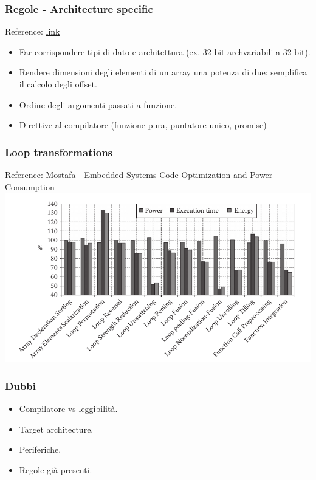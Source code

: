 \documentclass{beamer}
\begin{document}
\begin{frame}
\frametitle{Regole - Architecture specific}
Reference: \href{https://www.embedded.com/energy-efficient-c-code-for-arm-devices/}{link}
\begin{itemize}
\item Far corrispondere tipi di dato e architettura (ex. 32 bit arch\textrightarrow variabili a 32 bit).
\item Rendere dimensioni degli elementi di un array una potenza di due: semplifica il calcolo degli offset.
\item Ordine degli argomenti passati a funzione.
\item Direttive al compilatore (funzione pura, puntatore unico, promise)
\end{itemize}
\end{frame}
\begin{frame}
\frametitle{Loop transformations}
Reference: Mostafa - Embedded Systems Code Optimization and Power Consumption
\includegraphics[scale=0.4]{graph.png}
\end{frame}

\begin{frame}
\frametitle{Dubbi}
\begin{itemize}
\item Compilatore vs leggibilità.
\item Target architecture.
\item Periferiche.
\item Regole già presenti.
\end{itemize}
\end{frame}
\end{document}
